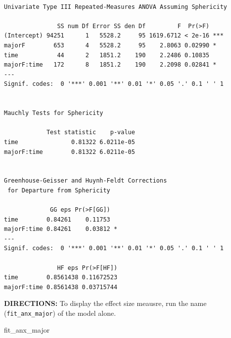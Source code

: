 \documentclass[]{article}
\newenvironment{Shaded}{\begin{snugshade}}{\end{snugshade}}
\newcommand{\KeywordTok}[1]{\textcolor[rgb]{0.13,0.29,0.53}{\textbf{#1}}}
\newcommand{\DataTypeTok}[1]{\textcolor[rgb]{0.13,0.29,0.53}{#1}}
\newcommand{\StringTok}[1]{\textcolor[rgb]{0.31,0.60,0.02}{#1}}
\newcommand{\CommentTok}[1]{\textcolor[rgb]{0.56,0.35,0.01}{\textit{#1}}}
\newcommand{\OperatorTok}[1]{\textcolor[rgb]{0.81,0.36,0.00}{\textbf{#1}}}
\newcommand{\NormalTok}[1]{#1}
\begin{document}
\begin{Shaded}
\end{Shaded}

\begin{verbatim}

Univariate Type III Repeated-Measures ANOVA Assuming Sphericity

               SS num Df Error SS den Df         F  Pr(>F)    
(Intercept) 94251      1   5528.2     95 1619.6712 < 2e-16 ***
majorF        653      4   5528.2     95    2.8063 0.02990 *  
time           44      2   1851.2    190    2.2486 0.10835    
majorF:time   172      8   1851.2    190    2.2098 0.02841 *  
---
Signif. codes:  0 '***' 0.001 '**' 0.01 '*' 0.05 '.' 0.1 ' ' 1


Mauchly Tests for Sphericity

            Test statistic    p-value
time               0.81322 6.0211e-05
majorF:time        0.81322 6.0211e-05


Greenhouse-Geisser and Huynh-Feldt Corrections
 for Departure from Sphericity

             GG eps Pr(>F[GG])  
time        0.84261    0.11753  
majorF:time 0.84261    0.03812 *
---
Signif. codes:  0 '***' 0.001 '**' 0.01 '*' 0.05 '.' 0.1 ' ' 1

               HF eps Pr(>F[HF])
time        0.8561438 0.11672523
majorF:time 0.8561438 0.03715744
\end{verbatim}

\clearpage

\textbf{DIRECTIONS:} To display the effect size meausre, run the name
(\texttt{fit\_anx\_major}) of the model alone.

\begin{Shaded}
\begin{Highlighting}[]
\NormalTok{fit_anx_major}
\end{Highlighting}
\end{Shaded}
\end{document}
